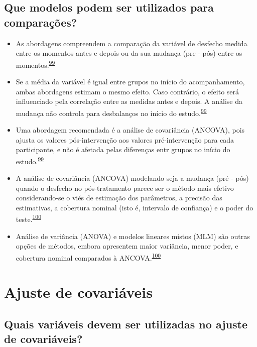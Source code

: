\documentclass[
]{book}
\begin{document}
\hypertarget{que-modelos-podem-ser-utilizados-para-comparauxe7uxf5es}{%
\subsection{Que modelos podem ser utilizados para comparações?}\label{que-modelos-podem-ser-utilizados-para-comparauxe7uxf5es}}

\begin{itemize}
\item
  As abordagens compreendem a comparação da variável de desfecho medida entre os momentos antes e depois ou da sua mudança (pre - pós) entre os momentos.\textsuperscript{\protect\hyperlink{ref-Vickers2001}{99}}
\item
  Se a média da variável é igual entre grupos no início do acompanhamento, ambas abordagens estimam o mesmo efeito. Caso contrário, o efeito será influenciado pela correlação entre as medidas antes e depois. A análise da mudança não controla para desbalanços no início do estudo.\textsuperscript{\protect\hyperlink{ref-Vickers2001}{99}}
\item
  Uma abordagem recomendada é a análise de covariância (ANCOVA), pois ajusta os valores pós-intervenção aos valores pré-intervenção para cada participante, e não é afetada pelas diferenças entr grupos no início do estudo.\textsuperscript{\protect\hyperlink{ref-Vickers2001}{99}}
\item
  A análise de covariância (ANCOVA) modelando seja a mudança (pré - pós) quando o desfecho no pós-tratamento parece ser o método mais efetivo considerando-se o viés de estimação dos parâmetros, a precisão das estimativas, a cobertura nominal (isto é, intervalo de confiança) e o poder do teste.\textsuperscript{\protect\hyperlink{ref-OConnell2017}{100}}
\item
  Análise de variância (ANOVA) e modelos lineares mistos (MLM) são outras opções de métodos, embora apresentem maior variância, menor poder, e cobertura nominal comparados à ANCOVA.\textsuperscript{\protect\hyperlink{ref-OConnell2017}{100}}
\end{itemize}

\hypertarget{ajuste-de-covariaveis}{%
\section{Ajuste de covariáveis}\label{ajuste-de-covariaveis}}

\hypertarget{quais-variuxe1veis-devem-ser-utilizadas-no-ajuste-de-covariuxe1veis}{%
\subsection{Quais variáveis devem ser utilizadas no ajuste de covariáveis?}\label{quais-variuxe1veis-devem-ser-utilizadas-no-ajuste-de-covariuxe1veis}}
\end{document}
